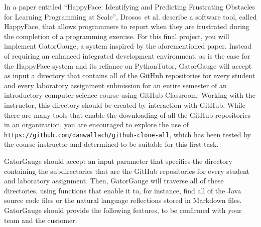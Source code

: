 \documentclass[11pt]{article}
\newcommand{\etal}{et al.\xspace}
\newcommand{\url}[1]{\lstinline{#1}}
\begin{document}
In a paper entitled ``HappyFace: Identifying and Predicting Frustrating Obstacles for Learning Programming at Scale'',
Drosos~\etal{} describe a software tool, called HappyFace, that allows programmers to report when they are frustrated
during the completion of a programming exercise. For this final project, you will implement GatorGauge, a system
inspired by the aforementioned paper. Instead of requiring an enhanced integrated development environment, as is the
case for the HappyFace system and its reliance on PythonTutor, GatorGauge will accept as input a directory that contains
all of the GitHub repositories for every student and every laboratory assignment submission for an entire semester of an
introductory computer science course using GitHub Classroom. Working with the instructor, this directory should be
created by interaction with GitHub. While there are many tools that enable the downloading of all the GitHub
repositories in an organization, you are encouraged to explore the use of
\url{https://github.com/danwallach/github-clone-all}, which has been tested by the course instructor and determined to
be suitable for this first task.

GatorGauge should accept an input parameter that specifies the directory containing the subdirectories that are the
GitHub repositories for every student and laboratory assignment. Then, GatorGauge will traverse all of these
directories, using functions that enable it to, for instance, find all of the Java source code files or the natural
language reflections stored in Markdown files. GatorGauge should provide the following features, to be confirmed with
your team and the customer.
\end{document}
